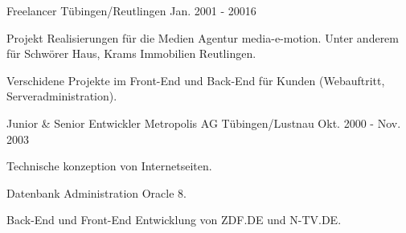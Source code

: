 \begin{cventries}
  \cventry
    {} %
    {Freelancer} %
    {Tübingen/Reutlingen} %
    {Jan. 2001 - 20016} %
    {
      \begin{cvitems} %
        \item {Projekt Realisierungen für die Medien Agentur media-e-motion. Unter anderem für Schwörer Haus, Krams Immobilien Reutlingen.}
        \item {Verschidene Projekte im Front-End und Back-End für Kunden (Webauftritt, Serveradministration).}
      \end{cvitems}
    }

  \cventry
    {Junior \& Senior Entwickler} %
    {Metropolis AG} %
    {Tübingen/Lustnau} %
    {Okt. 2000 - Nov. 2003} %
    {
      \begin{cvitems} %
        \item {Technische konzeption von Internetseiten.}
		\item {Datenbank Administration Oracle 8.}
		\item {Back-End und Front-End Entwicklung von ZDF.DE und N-TV.DE.}
      \end{cvitems}
    }


\end{cventries}
